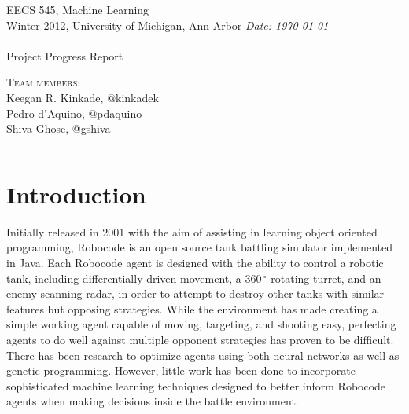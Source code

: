\documentclass{article}
\newcommand{\shortbar}{\begin{center}\rule{5ex}{0.1pt}\end{center}}
\newcommand{\courseNumber}{EECS 545}
\newcommand{\courseTitle}{Machine Learning}
\newcommand{\semester}{Winter 2012}
\theoremstyle{plain}
\theoremstyle{definition}
\theoremstyle{remark}
\newenvironment{solution}[1]{\medskip\noindent{\bf Problem #1.~}}{\shortbar}
\newcommand{\solutions}[4]{
\vspace{-2ex}
\begin{center}
{\small  \courseNumber, \courseTitle
\hfill {\Large \bf {#1} }\\
\semester, University of Michigan, Ann Arbor \hfill
{\em Date: #3}}\\
\vspace{-1ex}
\hrulefill\\
\vspace{4ex}
{\normalsize Project Progress Report}\\
\vspace{2ex}
\end{center}
\begin{trivlist}
\item \textsc{Team members:} {#4}
\end{trivlist}
\noindent
\shortbar
\vspace{3ex}
}
\begin{document}
\solutions{}{}{\today}{\\ Keegan R. Kinkade, @kinkadek\\ Pedro d'Aquino, @pdaquino \\Shiva Ghose, @gshiva }
%
%

\begin{abstract}

In order for artificial intelligence agents to autonomously operate within a given environment, they must be capable of processing perceptual knowledge in such a manner as to intelligently interact with their environment. For a competitively driven AI agent, this becomes increasingly important, as the inability to intelligently process perceptual information will ultimately lead to defeat by those who are capable of such computation. To this end, the following describes the implementation of sophisticated machine learning techniques in an artificially driven tank battle simulator. Armed with such techniques, it is the goal of this project to provide a competitive, autonomous AI agent with the ability to determine how to best evade an opponent's attacks while striking in such a manner as to maximize the possibility of destroying the enemy. 

\end{abstract}

\section{Introduction}

Initially released in 2001 with the aim of assisting in learning object oriented programming, Robocode is an open source tank battling simulator implemented in Java. Each Robocode agent is designed with the ability to control a robotic tank, including differentially-driven movement, a $360\,^{\circ}\mathrm{}$ rotating turret, and an enemy scanning radar, in order to attempt to destroy other tanks with similar features but opposing strategies. While the environment has made creating a simple working agent capable of moving, targeting, and shooting easy, perfecting agents to do well against multiple opponent strategies has proven to be difficult. There has been research to optimize agents using both neural networks as well as genetic programming. However, little work has been done to incorporate sophisticated machine learning techniques designed to better inform Robocode agents when making decisions inside the battle environment.
\end{document}
